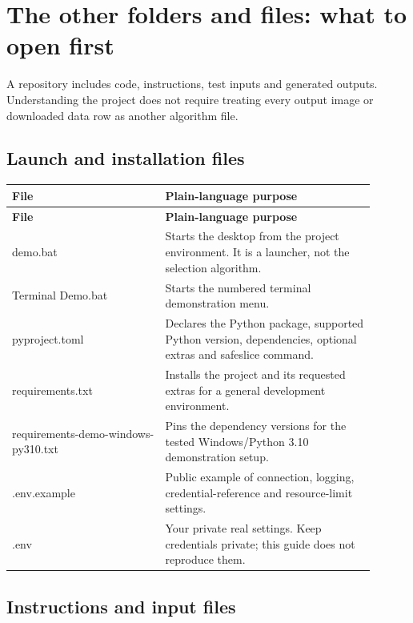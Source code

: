 \chapter{The other folders and files: what to open first}

A repository includes code, instructions, test inputs and generated outputs. Understanding the project does not require treating every output image or downloaded data row as another algorithm file.

\section{Launch and installation files}

\begin{longtable}{>{\RaggedRight\arraybackslash}p{0.38\linewidth}>{\RaggedRight\arraybackslash}p{0.52\linewidth}}
\toprule
\textbf{File} & \textbf{Plain-language purpose} \\
\midrule
\endfirsthead
\toprule
\textbf{File} & \textbf{Plain-language purpose} \\
\midrule
\endhead
demo.bat & Starts the desktop from the project environment. It is a launcher, not the selection algorithm. \\[5pt]
Terminal Demo.bat & Starts the numbered terminal demonstration menu. \\[5pt]
pyproject.toml & Declares the Python package, supported Python version, dependencies, optional extras and safeslice command. \\[5pt]
requirements.txt & Installs the project and its requested extras for a general development environment. \\[5pt]
requirements-demo-windows-py310.txt & Pins the dependency versions for the tested Windows/Python 3.10 demonstration setup. \\[5pt]
.env.example & Public example of connection, logging, credential-reference and resource-limit settings. \\[5pt]
.env & Your private real settings. Keep credentials private; this guide does not reproduce them. \\[5pt]
\bottomrule
\end{longtable}

\section{Instructions and input files}

